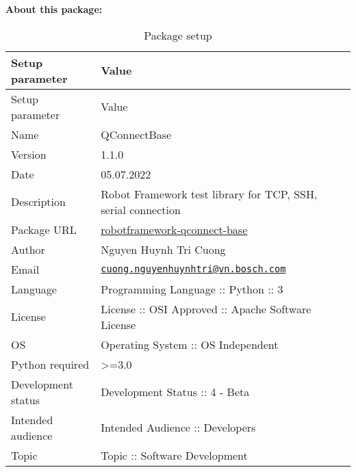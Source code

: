 %
%

\textbf{About this package:}

\begin{longtable}[]{@{}ll@{}}
\caption{Package setup}\tabularnewline
\toprule()
Setup parameter & Value \\
\midrule()
\endfirsthead
\toprule()
Setup parameter & Value \\
\midrule()
\endhead
Name & QConnectBase \\
Version & 1.1.0 \\
Date & 05.07.2022 \\
Description & Robot Framework test library for TCP, SSH, serial
connection \\
Package URL &
\href{https://github.com/test-fullautomation/robotframework-qconnect-base}{robotframework-qconnect-base} \\
Author & Nguyen Huynh Tri Cuong \\
Email &
\href{mailto:cuong.nguyenhuynhtri@vn.bosch.com}{\nolinkurl{cuong.nguyenhuynhtri@vn.bosch.com}} \\
Language & Programming Language :: Python :: 3 \\
License & License :: OSI Approved :: Apache Software License \\
OS & Operating System :: OS Independent \\
Python required & \textgreater=3.0 \\
Development status & Development Status :: 4 - Beta \\
Intended audience & Intended Audience :: Developers \\
Topic & Topic :: Software Development \\
\bottomrule()
\end{longtable}
